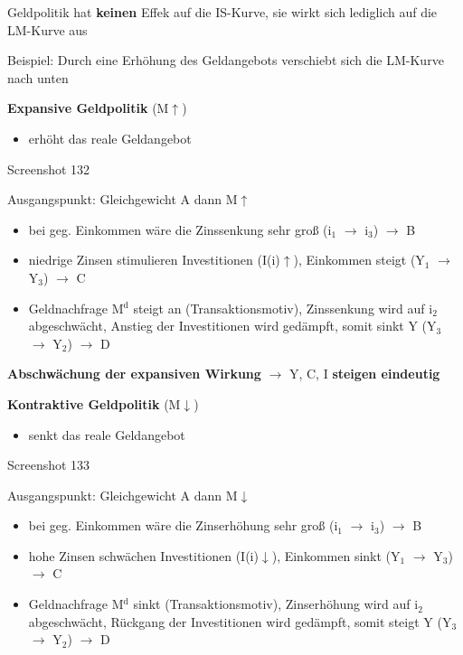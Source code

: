 \documentclass[11pt]{article}
\begin{document}
\begin{enumerate}
Geldpolitik hat \textbf{keinen} Effek auf die IS-Kurve, sie wirkt sich lediglich auf die LM-Kurve aus

Beispiel: Durch eine Erhöhung des Geldangebots verschiebt sich die LM-Kurve nach unten

\textbf{Expansive Geldpolitik} (M\(\uparrow\))\\
\begin{itemize}
\item erhöht das reale Geldangebot
\end{itemize}

Screenshot 132

Ausgangspunkt: Gleichgewicht A dann M\(\uparrow\)

\begin{itemize}
\item bei geg. Einkommen wäre die Zinssenkung sehr groß (i\(_{\text{1}}\) \(\rightarrow\) i\(_{\text{3}}\)) \(\rightarrow\) B
\item niedrige Zinsen stimulieren Investitionen (I(i)\(\uparrow\)), Einkommen steigt (Y\(_{\text{1}}\) \(\rightarrow\) Y\(_{\text{3}}\)) \(\rightarrow\) C
\item Geldnachfrage M\(^{\text{d}}\) steigt an (Transaktionsmotiv), Zinssenkung wird auf i\(_{\text{2}}\) abgeschwächt, Anstieg der Investitionen wird gedämpft, somit sinkt Y (Y\(_{\text{3}}\) \(\rightarrow\) Y\(_{\text{2}}\)) \(\rightarrow\) D
\end{itemize}

\textbf{Abschwächung der expansiven Wirkung} \(\rightarrow\) Y, C, I \textbf{steigen eindeutig}

\textbf{Kontraktive Geldpolitik} (M\(\downarrow\))\\
\begin{itemize}
\item senkt das reale Geldangebot
\end{itemize}

Screenshot 133

Ausgangspunkt: Gleichgewicht A dann M\(\downarrow\)

\begin{itemize}
\item bei geg. Einkommen wäre die Zinserhöhung sehr groß (i\(_{\text{1}}\) \(\rightarrow\) i\(_{\text{3}}\)) \(\rightarrow\) B
\item hohe Zinsen schwächen Investitionen (I(i)\(\downarrow\)), Einkommen sinkt (Y\(_{\text{1}}\) \(\rightarrow\) Y\(_{\text{3}}\)) \(\rightarrow\) C
\item Geldnachfrage M\(^{\text{d}}\) sinkt (Transaktionsmotiv), Zinserhöhung wird auf i\(_{\text{2}}\) abgeschwächt, Rückgang der Investitionen wird gedämpft, somit steigt Y (Y\(_{\text{3}}\) \(\rightarrow\) Y\(_{\text{2}}\)) \(\rightarrow\) D
\end{itemize}


\end{enumerate}
\end{document}
